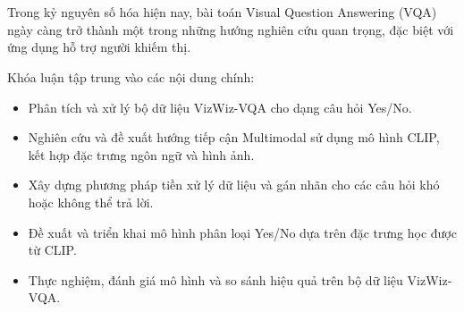 \chapter*{}

Trong kỷ nguyên số hóa hiện nay, bài toán Visual Question Answering (VQA) 
ngày càng trở thành một trong những hướng nghiên cứu quan trọng, đặc biệt 
với ứng dụng hỗ trợ người khiếm thị.  

Khóa luận tập trung vào các nội dung chính:  
\begin{itemize}
    \item Phân tích và xử lý bộ dữ liệu VizWiz-VQA cho dạng câu hỏi Yes/No.  
    \item Nghiên cứu và đề xuất hướng tiếp cận Multimodal sử dụng mô hình CLIP, kết hợp đặc trưng ngôn ngữ và hình ảnh.  
    \item Xây dựng phương pháp tiền xử lý dữ liệu và gán nhãn cho các câu hỏi khó hoặc không thể trả lời.  
    \item Đề xuất và triển khai mô hình phân loại Yes/No dựa trên đặc trưng học được từ CLIP.  
    \item Thực nghiệm, đánh giá mô hình và so sánh hiệu quả trên bộ dữ liệu VizWiz-VQA.  
\end{itemize}
